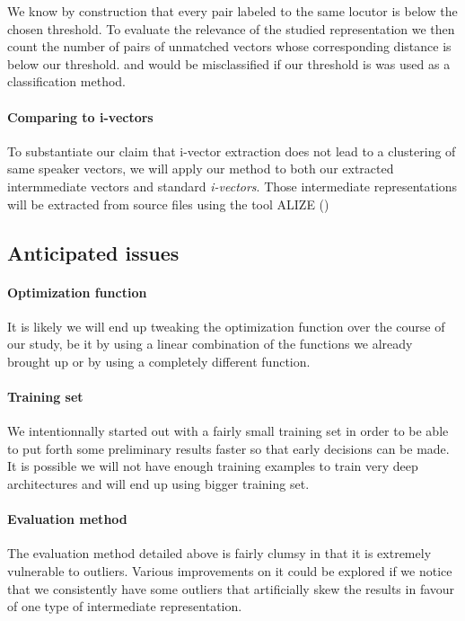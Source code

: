 \documentclass[conference]{IEEEtran}
\begin{document}
We know by construction that every pair labeled to the same locutor is below the
chosen threshold. To evaluate the relevance of the studied representation we
then count the number of pairs of unmatched vectors whose corresponding distance
is below our threshold. and would be misclassified if our threshold is was used
as a classification method.

\paragraph{Comparing to i-vectors}

 To substantiate our claim that i-vector extraction does not lead to a
 clustering of same speaker vectors, we will apply our method to both our
 extracted intermmediate vectors and standard \emph{i-vectors}. Those
 intermediate representations will be extracted from source files using the tool
 ALIZE (\cite{larcher2013alize})

\subsection{Anticipated issues}

\paragraph{Optimization function}

It is likely we will end up tweaking the optimization function over the course
of our study, be it by using a linear combination of the functions we already
brought up or by using a completely different function.

\paragraph{Training set}

We intentionnally started out with a fairly small training set in order to be
able to put forth some preliminary results faster so that early decisions can be
made. It is possible we will not have enough training examples to train very
deep architectures and will end up using bigger training set.

\paragraph{Evaluation method}

The evaluation method detailed above is fairly clumsy in that it is extremely
vulnerable to outliers. Various improvements on it could be explored if we
notice that we consistently have some outliers that artificially skew the
results in favour of one type of intermediate representation.
\end{document}
